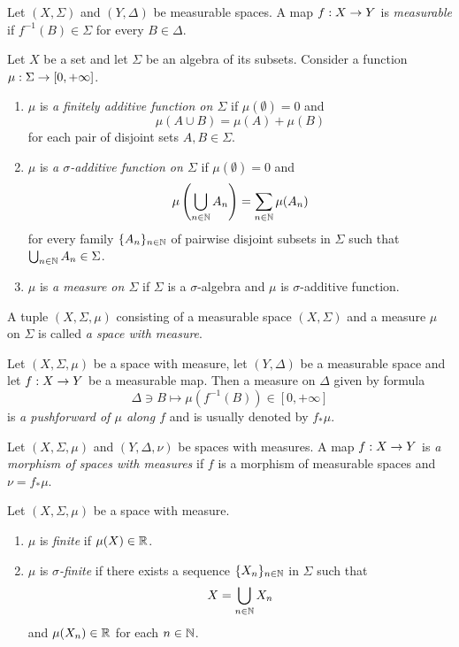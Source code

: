 \begin{definition}
Let $(X,\Sigma)$ and $(Y,\Delta)$ be measurable spaces. A map $f:X\rightarrow Y$ is \textit{measurable} if $f^{-1}(B)\in \Sigma$ for every $B\in \Delta$.
\end{definition}

\begin{definition}
Let $X$ be a set and let $\Sigma$ be an algebra of its subsets. Consider a function $\mu:\Sigma \rightarrow [0,+\infty]$.
\begin{enumerate}[label=\textbf{(\arabic*)}, leftmargin=*]
\item $\mu$ is \textit{a finitely additive function on $\Sigma$} if $\mu(\emptyset) = 0$ and 
$$\mu\left(A\cup B\right) = \mu(A) + \mu(B)$$
for each pair of disjoint sets $A,B\in \Sigma$.
\item $\mu$ is \textit{a $\sigma$-additive function on $\Sigma$} if $\mu(\emptyset) = 0$ and
$$\mu\left(\bigcup_{n\in {\mathbb N}}A_n\right)=\sum_{n\in {\mathbb N}}\mu(A_n)$$
for every family  $\{A_n\}_{n\in {\mathbb N}}$ of pairwise disjoint subsets in $\Sigma$ such that $\bigcup_{n\in {\mathbb N}}A_n\in \Sigma$.
\item $\mu$ is \textit{a measure on $\Sigma$} if $\Sigma$ is a $\sigma$-algebra and $\mu$ is $\sigma$-additive function.
\end{enumerate}
\end{definition}

\begin{definition}
A tuple $(X,\Sigma,\mu)$ consisting of a measurable space $\left(X,\Sigma\right)$ and a measure $\mu$ on $\Sigma$ is called \textit{a space with measure}.
\end{definition}

\begin{definition}
Let $(X,\Sigma,\mu)$ be a space with measure, let $(Y,\Delta)$ be a measurable space and let $f:X\rightarrow Y$ be a measurable map. Then a measure on $\Delta$ given by formula
$$\Delta \ni B \mapsto \mu\left(f^{-1}(B)\right) \in [0,+\infty]$$
is \textit{a pushforward of $\mu$ along $f$} and is usually denoted by $f_*\mu$.
\end{definition}

\begin{definition}
Let $(X,\Sigma,\mu)$ and $(Y,\Delta,\nu)$ be spaces with measures. A map $f:X\rightarrow Y$ is \textit{a morphism of spaces with measures} if $f$ is a morphism of measurable spaces and $\nu = f_*\mu$.
\end{definition}

\begin{definition}
Let $(X,\Sigma,\mu)$ be a space with measure.
\begin{enumerate}[label=\textbf{(\arabic*)}, leftmargin=*]
\item $\mu$ is \textit{finite} if $\mu(X) \in {\mathbb R}$.
\item $\mu$ is \textit{$\sigma$-finite} if there exists a sequence $\{X_n\}_{n\in {\mathbb N}}$ in $\Sigma$ such that 
$$X = \bigcup_{n\in {\mathbb N}}X_n$$
and $\mu(X_n)\in {\mathbb R}$ for each $n\in {\mathbb N}$.
\end{enumerate}
\end{definition}

